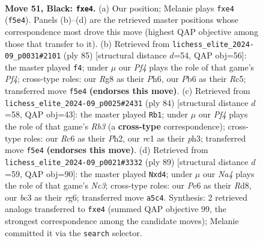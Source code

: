 \documentclass[11pt]{article}
\begin{document}
\clearpage

\begin{figure}[p]\centering
\begin{subfigure}{0.46\textwidth}\centering
\resizebox{\linewidth}{!}{%
\newchessgame
\chessboard[
  setfen={6r1/p7/1pr1p2p/n4pk1/2P1P3/N1B2P2/P3K1PR/2R5 b - - 2 51},
  showmover=false,
  pgfstyle=straightmove, color=movearrow, markmove={f5-e4}
]}
\caption{}
\end{subfigure}\hfill
\begin{subfigure}{0.46\textwidth}\centering
\resizebox{\linewidth}{!}{%
\newchessgame
\chessboard[
  setfen={8/p7/Bp2R2p/2r2ppk/P1n5/7P/KP1r4/3N3R b - - 0 43},
  showmover=false,
  pgfstyle=straightmove, color=movearrow, markmove={f5-f4}
]}
\caption{}
\end{subfigure}
\\[4pt]
\begin{subfigure}{0.46\textwidth}\centering
\resizebox{\linewidth}{!}{%
\newchessgame
\chessboard[
  setfen={5r2/1p6/2p5/1rPp2k1/1N1P2p1/pR2P2p/P3K2P/8 w - - 0 43},
  showmover=false,
  pgfstyle=straightmove, color=movearrow, markmove={b3-b1}
]}
\caption{}
\end{subfigure}\hfill
\begin{subfigure}{0.46\textwidth}\centering
\resizebox{\linewidth}{!}{%
\newchessgame
\chessboard[
  setfen={3r4/1k1r4/1pn3R1/p5p1/P2P1p2/6PP/1P4K1/3R2B1 b - - 1 45},
  showmover=false,
  pgfstyle=straightmove, color=movearrow, markmove={c6-d4}
]}
\caption{}
\end{subfigure}
\caption{\textbf{Move 51, Black: \texttt{fxe4}.} (a) Our position; Melanie plays \texttt{fxe4} (\texttt{f5e4}). Panels (b)--(d) are the retrieved master positions whose correspondence most drove this move (highest QAP objective among those that transfer to it). (b) Retrieved from \texttt{lichess\_elite\_2024-09\_p0031\#2101} (ply 85) [structural distance $d$=54, QAP obj=56]: the master played \texttt{f4}; under $\mu$ our \emph{Pf4} plays the role of that game's \emph{Pf4}; cross-type roles: our \emph{R}g8 as their \emph{P}h6, our \emph{P}b6 as their \emph{R}c5; transferred move \texttt{f5e4} \textbf{(endorses this move)}. (c) Retrieved from \texttt{lichess\_elite\_2024-09\_p0025\#2431} (ply 84) [structural distance $d$=58, QAP obj=43]: the master played \texttt{Rb1}; under $\mu$ our \emph{Pf4} plays the role of that game's \emph{Rb3} (a \textbf{cross-type} correspondence); cross-type roles: our \emph{R}c6 as their \emph{P}h2, our \emph{r}c1 as their \emph{p}h3; transferred move \texttt{f5e4} \textbf{(endorses this move)}. (d) Retrieved from \texttt{lichess\_elite\_2024-09\_p0021\#3332} (ply 89) [structural distance $d$=59, QAP obj=90]: the master played \texttt{Nxd4}; under $\mu$ our \emph{Na4} plays the role of that game's \emph{Nc3}; cross-type roles: our \emph{P}e6 as their \emph{R}d8, our \emph{b}c3 as their \emph{r}g6; transferred move \texttt{a5c4}. Synthesis: 2 retrieved analogs transferred to \texttt{fxe4} (summed QAP objective 99, the strongest correspondence among the candidate moves); Melanie committed it via the \texttt{search} selector.}
\label{fig:thought-m101}
\end{figure}
\end{document}

